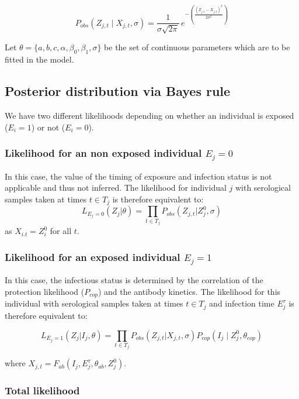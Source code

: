 \documentclass{article}
\begin{document}
\begin{equation}
\label{eq:ll_obs}
P_{obs}(Z_{j,t} \mid X_{j,t}, \sigma) = \frac{1}{\sigma \sqrt{2\pi}} \, e^{-\left(\frac{(Z_{j,t} - X_{j,t})^2}{2\sigma^2}\right)}
\end{equation}

Let $\theta = \{a, b, c, \alpha, \beta_0, \beta_1, \sigma\}$ be the set of continuous parameters which are to be fitted in the model. 

\subsection{Posterior distribution via Bayes rule}

We have two different likelihoods depending on whether an individual is exposed ($E_i = 1$) or not ($E_i = 0$).

\subsubsection{Likelihood for an non exposed individual $E_j = 0$} 
In this case, the value of the timing of exposure and infection status is not applicable and thus not inferred. The likelihood for individual $j$ with serological samples taken at times $t\in T_j$ is therefore equivalent to:
\begin{equation}
L_{E_j = 0}(Z_{j}| \theta) = \prod_{t \in T_j}P_{obs}(Z_{j,t}|Z^0_{j}, \sigma)
\end{equation}
as $X_{i.t} = Z^0_{i}$ for all $t$.


\subsubsection{Likelihood for an exposed individual $E_j = 1$}
In this case, the infectious status is determined by the correlation of the protection likelihood ($P_{cop}$) and the antibody kinetics. The likelihood for this individual with serological samples taken at times $t\in T_j$ and infection time $E^\tau_j$ is therefore equivalent to:

\begin{equation}
L_{E_j = 1}(Z_{j}| I_j, \theta) = \prod_{t \in T_j}P_{obs}(Z_{j,t}| X_{j,t}, \sigma)P_{cop}(I_j \mid Z_{j}^0, \theta_{cop})
\end{equation}

where $X_{j,t} = F_{ab}( I_j,  E_j^\tau, \theta_{ab}, Z^0_j)$.


\subsubsection{Total likelihood}
\end{document}
